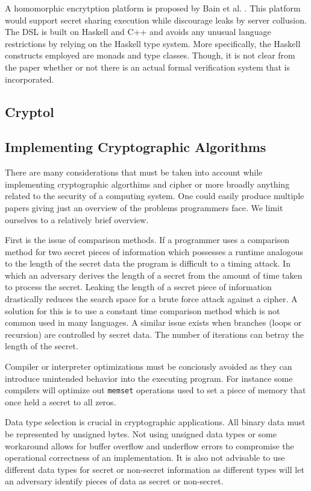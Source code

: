 A homomorphic encrytption platform is proposed by Bain et al. \cite{Bain}. This platform would support secret sharing execution while discourage leaks by server collusion. The DSL is built on Haskell and C++ and avoids any unusual language restrictions by relying on the Haskell type system. More specifically, the Haskell constructs employed are monads and type classes. Though, it is not clear from the paper whether or not there is an actual formal verification system that is incorporated.  


\subsection{Cryptol}

\subsection{Implementing Cryptographic Algorithms}
There are many considerations that must be taken into account while implementing cryptographic algorthims and cipher or more broadly anything related to the security of 
a computing system. One could easily produce multiple papers giving just an overview of the problems programmers face. We limit ourselves to a relatively brief overview.

First is the issue of comparison methods. If a programmer uses a comparison method for two secret pieces of information which possesses a runtime analogous to the length 
of the secret data the program is difficult to a timing attack. In which an adversary derives the length of a secret from the amount of time taken to process the secret. 
Leaking the length of a secret piece of information drastically reduces the search space for a brute force attack against a cipher. A solution for this is to use a 
constant time comparison method which is not common used in many languages. A similar issue exists when branches (loops or recursion) are controlled by secret data. The 
number of iterations can betray the length of the secret.

Compiler or interpreter optimizations must be conciously avoided as they can introduce unintended behavior into the executing program. For instance some compilers will 
optimize out \texttt{memset} operations used to set a piece of memory that once held a secret to all zeros.

Data type selection is crucial in cryptographic applications. All binary data must be represented by unsigned bytes. Not using unsigned data types or some workaround allows 
for buffer overflow and underflow errors to compromise the operational correctness of an implementation. It is also not advisable to use different data types for secret or 
non-secret information as different types will let an adversary identify pieces of data as secret or non-secret.

